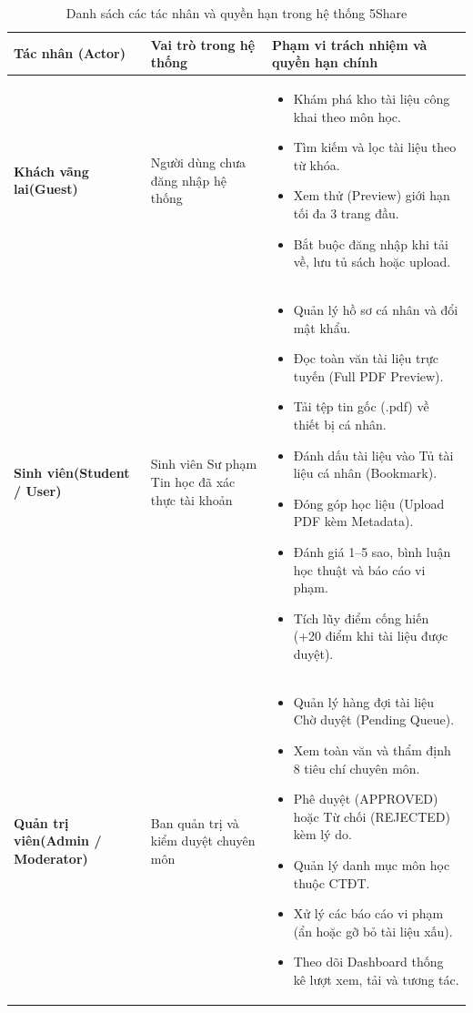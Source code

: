 \begin{table}[htbp]
\centering
\small
\caption{Danh sách các tác nhân và quyền hạn trong hệ thống 5Share}
\label{tab:actors}
\begin{tabularx}{\textwidth}{|p{3cm}|p{3.5cm}|X|}
\hline
\textbf{Tác nhân (Actor)} & \textbf{Vai trò trong hệ thống} & \textbf{Phạm vi trách nhiệm và quyền hạn chính} \\
\hline
\textbf{Khách vãng lai\newline(Guest)} & Người dùng chưa đăng nhập hệ thống & 
\begin{itemize}[leftmargin=*,noitemsep,topsep=0pt]
    \item Khám phá kho tài liệu công khai theo môn học.
    \item Tìm kiếm và lọc tài liệu theo từ khóa.
    \item Xem thử (Preview) giới hạn tối đa 3 trang đầu.
    \item Bắt buộc đăng nhập khi tải về, lưu tủ sách hoặc upload.
\end{itemize} \\
\hline
\textbf{Sinh viên\newline(Student / User)} & Sinh viên Sư phạm Tin học đã xác thực tài khoản & 
\begin{itemize}[leftmargin=*,noitemsep,topsep=0pt]
    \item Quản lý hồ sơ cá nhân và đổi mật khẩu.
    \item Đọc toàn văn tài liệu trực tuyến (Full PDF Preview).
    \item Tải tệp tin gốc (.pdf) về thiết bị cá nhân.
    \item Đánh dấu tài liệu vào Tủ tài liệu cá nhân (Bookmark).
    \item Đóng góp học liệu (Upload PDF kèm Metadata).
    \item Đánh giá 1--5 sao, bình luận học thuật và báo cáo vi phạm.
    \item Tích lũy điểm cống hiến (+20 điểm khi tài liệu được duyệt).
\end{itemize} \\
\hline
\textbf{Quản trị viên\newline(Admin / Moderator)} & Ban quản trị và kiểm duyệt chuyên môn & 
\begin{itemize}[leftmargin=*,noitemsep,topsep=0pt]
    \item Quản lý hàng đợi tài liệu Chờ duyệt (Pending Queue).
    \item Xem toàn văn và thẩm định 8 tiêu chí chuyên môn.
    \item Phê duyệt (APPROVED) hoặc Từ chối (REJECTED) kèm lý do.
    \item Quản lý danh mục môn học thuộc CTĐT.
    \item Xử lý các báo cáo vi phạm (ẩn hoặc gỡ bỏ tài liệu xấu).
    \item Theo dõi Dashboard thống kê lượt xem, tải và tương tác.
\end{itemize} \\
\hline
\end{tabularx}
\end{table}

